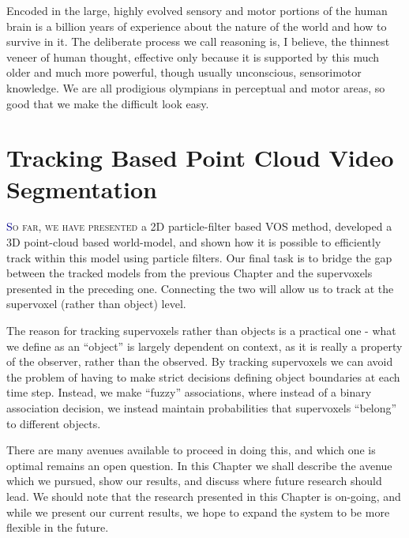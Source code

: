 \begin{savequote}[75mm]
Encoded in the large, highly evolved sensory and motor portions of the human brain is a billion years of experience about the nature of the world and how to survive in it. The deliberate process we call reasoning is, I believe, the thinnest veneer of human thought, effective only because it is supported by this much older and much more powerful, though usually unconscious, sensorimotor knowledge. We are all prodigious olympians in perceptual and motor areas, so good that we make the difficult look easy. 
\end{savequote}


\chapter{Tracking Based Point Cloud Video Segmentation}
\label{Chap:TrackingBasedSegmentation}
\lettrine[lines=3, loversize=0.3]{\textcolor{DarkBlue}S}{o far, we have presented} a 2D particle-filter based VOS method, developed a 3D point-cloud based world-model, and shown how it is possible to efficiently track within this model using particle filters. Our final task is to bridge the gap between the tracked models from the previous Chapter and the supervoxels presented in the preceding one. Connecting the two will allow us to track at the supervoxel (rather than object) level. 

The reason for tracking supervoxels rather than objects is a practical one - what we define as an ``object'' is largely dependent on context, as it is really a property of the observer, rather than the observed. By tracking supervoxels we can avoid the problem of having to make strict decisions defining object boundaries at each time step. Instead, we make ``fuzzy'' associations, where instead of a binary association decision, we instead maintain probabilities that supervoxels ``belong'' to different objects.

There are many avenues available to proceed in doing this, and which one is optimal remains an open question. In this Chapter we shall describe the avenue which we pursued, show our results, and discuss where future research should lead. We should note that the research presented in this Chapter is on-going, and while we present our current results, we hope to expand the system to be more flexible in the future.

